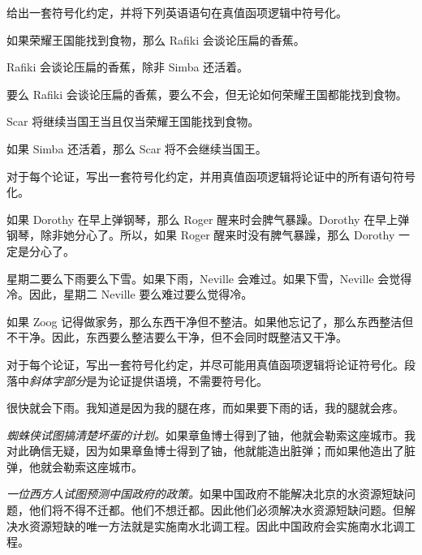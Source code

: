 \solutions
\problempart
给出一套符号化约定，并将下列英语语句在真值函项逻辑中符号化。

\begin{compactlist}
\item 如果荣耀王国能找到食物，那么 Rafiki 会谈论压扁的香蕉。
\item Rafiki 会谈论压扁的香蕉，除非 Simba 还活着。
\item 要么 Rafiki 会谈论压扁的香蕉，要么不会，但无论如何荣耀王国都能找到食物。
\item Scar 将继续当国王当且仅当荣耀王国能找到食物。
\item 如果 Simba 还活着，那么 Scar 将不会继续当国王。
\end{compactlist}

\problempart
对于每个论证，写出一套符号化约定，并用真值函项逻辑将论证中的所有语句符号化。

\begin{compactlist}
\item 如果 Dorothy 在早上弹钢琴，那么 Roger 醒来时会脾气暴躁。Dorothy 在早上弹钢琴，除非她分心了。所以，如果 Roger 醒来时没有脾气暴躁，那么 Dorothy 一定是分心了。
\item 星期二要么下雨要么下雪。如果下雨，Neville 会难过。如果下雪，Neville 会觉得冷。因此，星期二 Neville 要么难过要么觉得冷。
\item 如果 Zoog 记得做家务，那么东西干净但不整洁。如果他忘记了，那么东西整洁但不干净。因此，东西要么整洁要么干净，但不会同时既整洁又干净。
\end{compactlist}

\problempart
对于每个论证，写出一套符号化约定，并尽可能用真值函项逻辑将论证符号化。段落中\emph{斜体字部分}是为论证提供语境，不需要符号化。

\begin{compactlist}
\item 很快就会下雨。我知道是因为我的腿在疼，而如果要下雨的话，我的腿就会疼。

\item\emph{蜘蛛侠试图搞清楚坏蛋的计划。}如果章鱼博士得到了铀，他就会勒索这座城市。我对此确信无疑，因为如果章鱼博士得到了铀，他就能造出脏弹；而如果他造出了脏弹，他就会勒索这座城市。

\item\emph{一位西方人试图预测中国政府的政策。}如果中国政府不能解决北京的水资源短缺问题，他们将不得不迁都。他们不想迁都。因此他们必须解决水资源短缺问题。但解决水资源短缺的唯一方法就是实施南水北调工程。因此中国政府会实施南水北调工程。

\end{compactlist}

